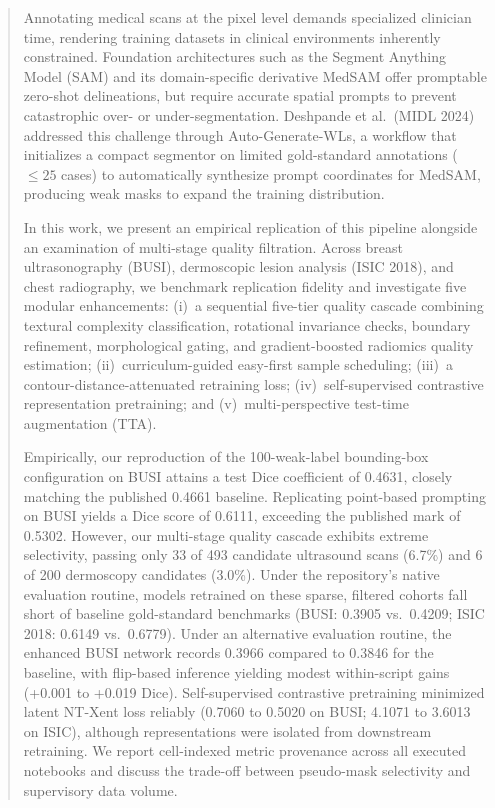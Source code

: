 \documentclass[journal,11pt,onecolumn,draftclsnofoot]{IEEEtran}
\begin{document}
\begin{abstract}
Annotating medical scans at the pixel level demands specialized clinician time, rendering training datasets in clinical environments inherently constrained. Foundation architectures such as the Segment Anything Model (SAM) and its domain-specific derivative MedSAM offer promptable zero-shot delineations, but require accurate spatial prompts to prevent catastrophic over- or under-segmentation. Deshpande et al.\ (MIDL 2024) addressed this challenge through Auto-Generate-WLs, a workflow that initializes a compact segmentor on limited gold-standard annotations ($\le 25$ cases) to automatically synthesize prompt coordinates for MedSAM, producing weak masks to expand the training distribution. 

In this work, we present an empirical replication of this pipeline alongside an examination of multi-stage quality filtration. Across breast ultrasonography (BUSI), dermoscopic lesion analysis (ISIC 2018), and chest radiography, we benchmark replication fidelity and investigate five modular enhancements: (i)~a sequential five-tier quality cascade combining textural complexity classification, rotational invariance checks, boundary refinement, morphological gating, and gradient-boosted radiomics quality estimation; (ii)~curriculum-guided easy-first sample scheduling; (iii)~a contour-distance-attenuated retraining loss; (iv)~self-supervised contrastive representation pretraining; and (v)~multi-perspective test-time augmentation (TTA). 

Empirically, our reproduction of the 100-weak-label bounding-box configuration on BUSI attains a test Dice coefficient of 0.4631, closely matching the published 0.4661 baseline. Replicating point-based prompting on BUSI yields a Dice score of 0.6111, exceeding the published mark of 0.5302. However, our multi-stage quality cascade exhibits extreme selectivity, passing only 33 of 493 candidate ultrasound scans (6.7\%) and 6 of 200 dermoscopy candidates (3.0\%). Under the repository's native evaluation routine, models retrained on these sparse, filtered cohorts fall short of baseline gold-standard benchmarks (BUSI: 0.3905 vs.\ 0.4209; ISIC 2018: 0.6149 vs.\ 0.6779). Under an alternative evaluation routine, the enhanced BUSI network records 0.3966 compared to 0.3846 for the baseline, with flip-based inference yielding modest within-script gains (+0.001 to +0.019 Dice). Self-supervised contrastive pretraining minimized latent NT-Xent loss reliably (0.7060 to 0.5020 on BUSI; 4.1071 to 3.6013 on ISIC), although representations were isolated from downstream retraining. We report cell-indexed metric provenance across all executed notebooks and discuss the trade-off between pseudo-mask selectivity and supervisory data volume.
\end{abstract}
\end{document}
